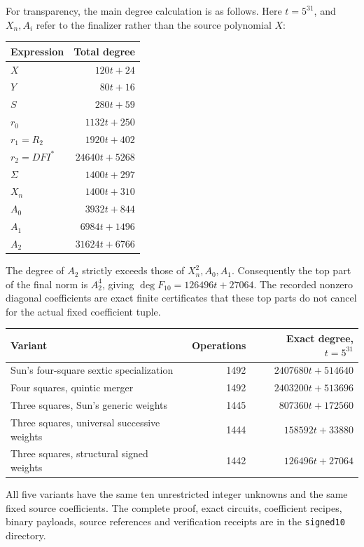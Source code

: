 For transparency, the main degree calculation is as follows.  Here
$t=5^{31}$, and $X_n,A_i$ refer to the finalizer rather than the source
polynomial $X$:
\begin{center}
\begin{tabular}{@{}lr@{}}
\toprule
Expression & Total degree\\
\midrule
$X$ & $120t+24$\\
$Y$ & $80t+16$\\
$S$ & $280t+59$\\
$r_0$ & $1132t+250$\\
$r_1=R_2$ & $1920t+402$\\
$r_2=DFI^*$ & $24640t+5268$\\
$\Sigma$ & $1400t+297$\\
$X_n$ & $1400t+310$\\
$A_0$ & $3932t+844$\\
$A_1$ & $6984t+1496$\\
$A_2$ & $31624t+6766$\\
\bottomrule
\end{tabular}
\end{center}
The degree of $A_2$ strictly exceeds those of $X_n^2,A_0,A_1$.
Consequently the top part of the final norm is $A_2^4$, giving
$\deg F_{10}=126496t+27064$.  The recorded nonzero diagonal coefficients
are exact finite certificates that these top parts do not cancel for
the actual fixed coefficient tuple.

\begin{center}
\begin{tabular}{lrr}
Variant & Operations & Exact degree, $t=5^{31}$\\ \hline
Sun's four-square sextic specialization &1492&$2407680t+514640$\\
Four squares, quintic merger &1492&$2403200t+513696$\\
Three squares, Sun's generic weights &1445&$807360t+172560$\\
Three squares, universal successive weights &1444&$158592t+33880$\\
Three squares, structural signed weights &1442&$126496t+27064$
\end{tabular}
\end{center}
All five variants have the same ten unrestricted integer unknowns and
the same fixed source coefficients.  The complete proof, exact circuits,
coefficient recipes, binary payloads, source references and verification
receipts are in the \texttt{signed10} directory.
